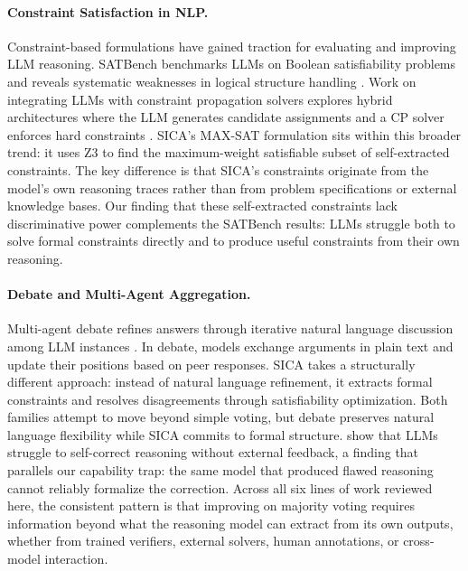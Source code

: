 \paragraph{Constraint Satisfaction in NLP.}
Constraint-based formulations have gained traction for evaluating and improving LLM reasoning. SATBench benchmarks LLMs on Boolean satisfiability problems and reveals systematic weaknesses in logical structure handling \citep{satbench2025}. Work on integrating LLMs with constraint propagation solvers explores hybrid architectures where the LLM generates candidate assignments and a CP solver enforces hard constraints \citep{llmmeets_cp2025}. SICA's MAX-SAT formulation sits within this broader trend: it uses Z3 to find the maximum-weight satisfiable subset of self-extracted constraints. The key difference is that SICA's constraints originate from the model's own reasoning traces rather than from problem specifications or external knowledge bases. Our finding that these self-extracted constraints lack discriminative power complements the SATBench results: LLMs struggle both to solve formal constraints directly and to produce useful constraints from their own reasoning.

\paragraph{Debate and Multi-Agent Aggregation.}
Multi-agent debate refines answers through iterative natural language discussion among LLM instances \citep{liang2023encouraging,du2023improving}. In debate, models exchange arguments in plain text and update their positions based on peer responses. SICA takes a structurally different approach: instead of natural language refinement, it extracts formal constraints and resolves disagreements through satisfiability optimization. Both families attempt to move beyond simple voting, but debate preserves natural language flexibility while SICA commits to formal structure. \citet{huang2024selfcorrect} show that LLMs struggle to self-correct reasoning without external feedback, a finding that parallels our capability trap: the same model that produced flawed reasoning cannot reliably formalize the correction. Across all six lines of work reviewed here, the consistent pattern is that improving on majority voting requires information beyond what the reasoning model can extract from its own outputs, whether from trained verifiers, external solvers, human annotations, or cross-model interaction.
